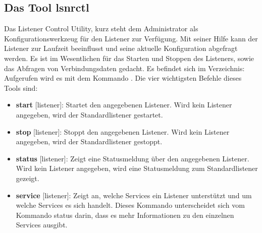       \subsection{Das Tool lsnrctl}
        \label{lsnrctl}
        Das Listener Control Utility, kurz  steht dem Administrator als Konfigurationswerkzeug f\"ur den Listener zur Verf\"ugung. Mit seiner Hilfe kann der Listener zur Laufzeit beeinflusst und seine aktuelle Konfiguration abgefragt werden. Es ist im Wesentlichen f\"ur das Starten und Stoppen des Listeners, sowie das Abfragen von Verbindungsdaten gedacht. Es befindet sich im Verzeichnis: 
\clearpage
        Aufgerufen wird es mit dem Kommando . Die vier
        wichtigsten Befehle dieses Tools sind:
        \begin{itemize}
          \item \textbf{start} [listener]: Startet den angegebenen Listener.
          Wird kein Listener angegeben, wird der Standardlistener
           gestartet.
          \item \textbf{stop} [listener]: Stoppt den angegebenen Listener. Wird
          kein Listener angegeben, wird der Standardlistener
           gestoppt.
          \item \textbf{status} [listener]: Zeigt eine Statusmeldung \"uber den
          angegebenen Listener. Wird kein Listener angegeben, wird
          eine Statusmeldung zum Standardlistener  gezeigt.
          \item \textbf{service} [listener]: Zeigt an, welche Services ein
          Listener unterst\"utzt und um welche Services es sich handelt. Dieses
          Kommando unterscheidet sich vom Kommando status darin, dass es mehr
          Informationen zu den einzelnen Services ausgibt.
        \end{itemize}

        \begin{literaturinternet}
          \item \cite{i486171}
        \end{literaturinternet}
